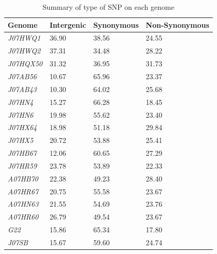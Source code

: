 \begin{table}[ht]
  \caption{Summary of type of SNP on each genome}
  \begin{tabularx}{\textwidth}{L{2.1cm}R{2.3cm}R{3cm}R{3.8cm}}
  \hline
    \textbf{Genome} & \textbf{Intergenic} & \textbf{Synonymous} & \textbf{Non-Synonymous}\\
    \hline
     \textit{J07HWQ1} & 36.90 & 38.56 & 24.55 \\
     \textit{J07HWQ2} & 37.31 & 34.48 & 28.22 \\
     \textit{J07HQX50} & 31.32 & 36.95 & 31.73 \\
     \textit{J07AB56} & 10.67 & 65.96 & 23.37 \\
     \textit{J07AB43} & 10.30 & 64.02 & 25.68 \\
     \textit{J07HN4} & 15.27 & 66.28 & 18.45 \\
     \textit{J07HN6} &  19.98 & 55.62 & 23.40\\
     \textit{J07HX64} & 18.98 & 51.18 & 29.84 \\
     \textit{J07HX5} & 20.72 & 53.88 & 25.41 \\
     \textit{J07HB67} & 12.06 & 60.65 & 27.29 \\
     \textit{J07HR59} & 23.78 & 53.89 & 22.33 \\
     \textit{A07HB70} & 22.38 & 49.23 & 28.40 \\
     \textit{A07HR67} & 20.75 & 55.58 & 23.67 \\
     \textit{A07HN63} & 21.55 & 54.69 & 23.76 \\
     \textit{A07HR60} & 26.79 & 49.54 & 23.67 \\
     \textit{G22} & 15.86 & 65.34 & 17.80 \\
     \textit{J07SB} & 15.67 & 59.60 & 24.74 \\     
  \end{tabularx}
  \label{TypeSNP_SummaryGenome}
\end{table}

